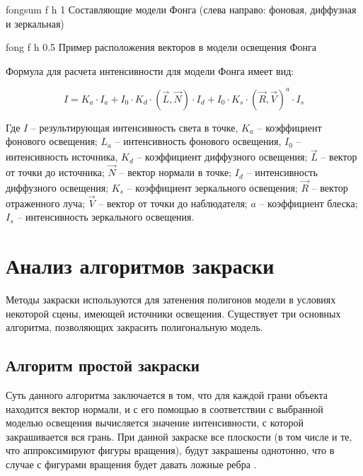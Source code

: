 \clearpage

{fongsum} %
{f} %
{h} %
{1\textwidth} %
{Составляющие модели Фонга (слева направо: фоновая, диффузная и зеркальная)} %

{fong} %
{f} %
{h} %
{0.5\textwidth} %
{Пример расположения векторов в модели освещения Фонга} %

Формула для расчета интенсивности для модели Фонга имеет вид:

\begin{equation}
	\label{equ:fong}
	I = K_a \cdot I_a + I_0 \cdot K_d \cdot (\vec{L}, \vec{N}) \cdot I_d + I_0 \cdot K_s \cdot (\vec{R}, \vec{V})^a \cdot I_s
\end{equation}

Где $I$ -- результирующая интенсивность света в точке, $K_a$ -- коэффициент фонового освещения; $L_a$ -- интенсивность фонового освещения, $I_0$ -- интенсивность источника, $K_d$ -- коэффициент диффузного освещения; $\vec{L}$ -- вектор от точки до источника; $\vec{N}$ -- вектор нормали в точке; $I_d$ -- интенсивность диффузного освещения; $K_s$ -- коэффициент зеркального освещения; $\vec{R}$ -- вектор отраженного луча; $\vec{V}$ -- вектор от точки до наблюдателя; $a$ -- коэффициент блеска; $I_s$ -- интенсивность зеркального освещения.

\section{Анализ алгоритмов закраски}

Методы закраски используются для затенения полигонов модели в
условиях некоторой сцены, имеющей источники освещения. Существует три
основных алгоритма, позволяющих закрасить полигональную модель.

\subsection{Алгоритм простой закраски}

Суть данного алгоритма заключается в том, что для каждой грани объекта
находится вектор нормали, и с его помощью в соответствии с выбранной
моделью освещения вычисляется значение интенсивности, с которой
закрашивается вся грань.
При данной закраске все плоскости (в том числе и те, что аппроксимируют
фигуры вращения), будут закрашены однотонно, что в случае с фигурами
вращения будет давать ложные ребра \cite{rodjers}.

